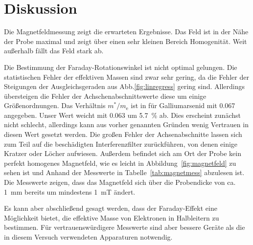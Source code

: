
\section{Diskussion}
Die Magnetfeldmessung zeigt die erwarteten Ergebnisse. Das Feld ist in
der Nähe der Probe maximal und zeigt über einen sehr kleinen Bereich
Homogenität.  Weit außerhalb fällt das Feld stark ab.

Die Bestimmung der Faraday-Rotationswinkel ist nicht optimal gelungen.
Die statistischen Fehler der effektiven Massen sind zwar sehr gering, 
da die Fehler der Steigungen der Ausgleichsgeraden aus 
Abb.\ref{fig:linregress} gering sind. Allerdings übersteigen 
die Fehler der Achschenabschnittswerte diese um einige 
Größenordnungen.
Das Verhältnis $m^*/m_\text{e}$ ist in \cite{ecee-colorado} für
Galliumarsenid mit \num{0.067} angegeben.  Unser Wert weicht mit
\num{0.063} um \SI{5.7}{\percent} ab.  Dies erscheint zunächst nicht
schlecht, allerdings kann aus vorher genannten Gründen wenig 
Vertrauen in diesen Wert gesetzt werden. 
Die großen Fehler der Achsenabschnitte lassen sich zum Teil auf 
die beschädigten Interferenzfilter
zurückführen, von denen einige Kratzer oder Löcher aufwiesen. Außerdem
befindet sich am Ort der Probe kein perfekt homogenes Magnetfeld, wie es
leicht in Abbildung~\ref{fig:magnetfeld} zu sehen ist und Anhand der
Messwerte in Tabelle~\ref{tab:magnetmess}  abzulesen ist. Die 
Messwerte zeigen, dass das
Magnetfeld sich über die Probendicke von ca. \SI{1}{\milli\metre}
bereits um mindestens \SI{1}{\milli\tesla} ändert.

Es kann aber abschließend gesagt werden, dass der Faraday-Effekt 
eine Möglichkeit bietet, die effektive Masse von Elektronen in 
Halbleitern zu bestimmen. Für vertrauenswürdigere Messwerte sind aber 
bessere Geräte als die in diesem Versuch verwendeten Apparaturen 
notwendig. 

